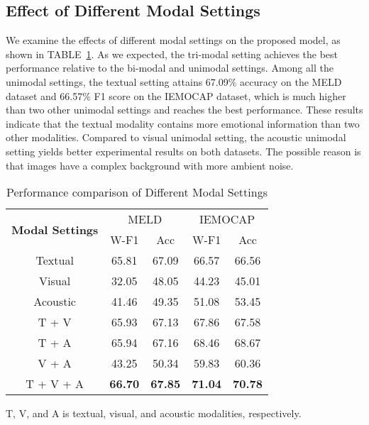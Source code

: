 \documentclass[journal]{IEEEtran}
\begin{document}
\subsection{Effect of Different Modal Settings}
We examine the effects of different modal settings on the proposed model, as shown in TABLE~\ref{tab:modal_settings}. As we expected, the tri-modal setting achieves the best performance relative to the bi-modal and unimodal settings. Among all the unimodal settings, the textual setting attains 67.09\% accuracy on the MELD dataset and 66.57\% F1 score on the IEMOCAP dataset, which is much higher than two other unimodal settings and reaches the best performance. These results indicate that the textual modality contains more emotional information than two other modalities. Compared to visual unimodal setting, the acoustic unimodal setting yields better experimental results on both datasets. The possible reason is that images have a complex background with more ambient noise.
\begin{table}[htbp]
    \centering
    \renewcommand{\arraystretch}{1.0}
    \setlength{\tabcolsep}{8pt}
    \caption{Performance comparison of Different Modal Settings}
    \begin{threeparttable}
    \begin{tabular}{c|cc|cc}
    \hline
    \multirow{2}{*}{\textbf{Modal Settings}} &\multicolumn{2}{c|}{MELD} &\multicolumn{2}{c}{IEMOCAP}\\
&W-F1 &Acc &W-F1 &Acc\\ 
    \hline 
	Textual &65.81 &67.09 &66.57 &66.56 \\
    Visual &32.05 &48.05 &44.23 &45.01 \\
	Acoustic &41.46 &49.35 &51.08 &53.45 \\
	\hline
	T + V &65.93 &67.13 &67.86 &67.58 \\
    T + A &65.94 &67.16 &68.46 &68.67 \\
	V + A &43.25 &50.34 &59.83 &60.36 \\
	\hline
    T + V + A &\textbf{66.70} &\textbf{67.85} &\textbf{71.04} &\textbf{70.78} \\
	\hline
    \end{tabular}
    \begin{tablenotes}
        \footnotesize
        \item T, V, and A is textual, visual, and acoustic modalities, respectively.
    \end{tablenotes}
    \end{threeparttable}
    \label{tab:modal_settings}
\end{table}
\end{document}
